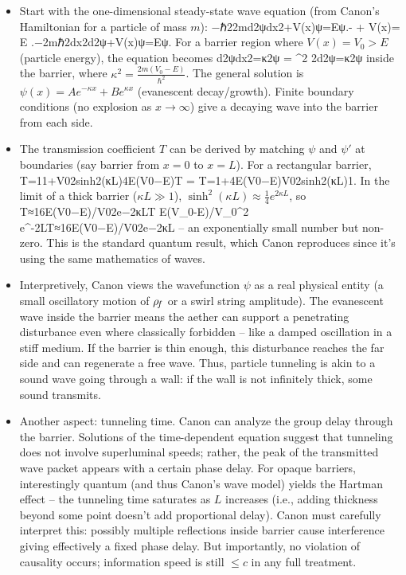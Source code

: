 \documentclass[11pt]{article}
\begin{document}
\begin{itemize}

\item 
Start with the one-dimensional steady-state wave equation (from Canon’s Hamiltonian for a particle of mass $m$): −ℏ22md2ψdx2+V(x)ψ=Eψ.- + V(x)\psi = E\,\psi\,.−2mℏ2dx2d2ψ+V(x)ψ=Eψ. For a barrier region where $V(x)=V_0 > E$ (particle energy), the equation becomes d2ψdx2=κ2ψ = \kappa^2 \psidx2d2ψ=κ2ψ inside the barrier, where $\kappa^2 = \frac{2m(V_0 - E)}{\hbar^2}$. The general solution is $\psi(x) = A e^{-\kappa x} + B e^{\kappa x}$ (evanescent decay/growth). Finite boundary conditions (no explosion as $x\to\infty$) give a decaying wave into the barrier from each side.




\item 
The transmission coefficient $T$ can be derived by matching $\psi$ and $\psi'$ at boundaries (say barrier from $x=0$ to $x=L$). For a rectangular barrier, T=11+V02sinh⁡2(κL)4E(V0−E)T = T=1+4E(V0−E)V02sinh2(κL)1. In the limit of a thick barrier ($\kappa L \gg 1$), $\sinh^2(\kappa L) \approx \frac{1}{4}e^{2\kappa L}$, so T≈16E(V0−E)/V02e−2κLT  E(V_0-E)/V_0^2 \, e^{-2\kappa L}T≈16E(V0−E)/V02e−2κL – an exponentially small number but non-zero. This is the standard quantum result, which Canon reproduces since it’s using the same mathematics of waves.




\item 
Interpretively, Canon views the wavefunction $\psi$ as a real physical entity (a small oscillatory motion of $\rho_{\!f}$ or a swirl string amplitude). The evanescent wave inside the barrier means the aether can support a penetrating disturbance even where classically forbidden – like a damped oscillation in a stiff medium. If the barrier is thin enough, this disturbance reaches the far side and can regenerate a free wave. Thus, particle tunneling is akin to a sound wave going through a wall: if the wall is not infinitely thick, some sound transmits.




\item 
Another aspect: tunneling time. Canon can analyze the group delay through the barrier. Solutions of the time-dependent equation suggest that tunneling does not involve superluminal speeds; rather, the peak of the transmitted wave packet appears with a certain phase delay. For opaque barriers, interestingly quantum (and thus Canon’s wave model) yields the Hartman effect – the tunneling time saturates as $L$ increases (i.e., adding thickness beyond some point doesn’t add proportional delay). Canon must carefully interpret this: possibly multiple reflections inside barrier cause interference giving effectively a fixed phase delay. But importantly, no violation of causality occurs; information speed is still $\le c$ in any full treatment.





\end{itemize}
\end{document}
